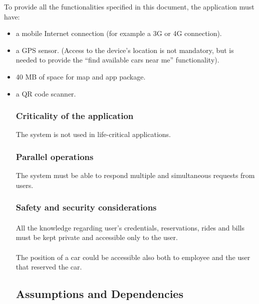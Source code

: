 \documentclass[english]{article}
\begin{document}
To provide all the functionalities specified in this document, the application must have:
\begin{itemize}
  \item{a mobile Internet connection (for example a 3G or 4G connection).}
  \item{a GPS sensor. (Access to the device’s location is not mandatory, but is needed to provide the “find available cars near me” functionality).}
  \item{40 MB of space for map and app package.}
  \item{a QR code scanner.}

\subsubsection{Criticality of the application}
The system is not used in life-critical applications.

\subsubsection{Parallel operations}
The system must be able to respond multiple and simultaneous requests from users.

\subsubsection{Safety and security considerations}
\paragraph{}
All the knowledge regarding user's credentials, reservations, rides and bills must be kept private and accessible only to the user.

\paragraph{}
The position of a car could be accessible also both to employee and the user that reserved the car.


\newpage
\subsection{Assumptions and Dependencies}


\end{itemize}
\end{document}
